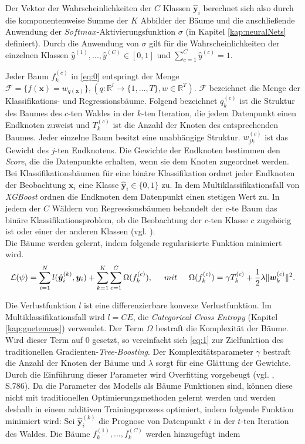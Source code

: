 \documentclass[a4paper,11pt]{article}
\begin{document}
Der Vektor der Wahrscheinlichkeiten der $C$ Klassen $\hat{\bm{y}}_i$ berechnet sich also durch die komponentenweise Summe der $K$ Abbilder der Bäume und die anschließende Anwendung der $Softmax$-Aktivierungsfunktion $\sigma$ (in Kapitel \ref{kap:neuralNets} definiert). Durch die Anwendung von $\sigma$ gilt für die Wahrscheinlichkeiten der einzelnen Klassen $\hat{y}^{(1)}, ..., \hat{y}^{(C)} \in [0,1]$ und $\sum_{c=1}^C \hat{y}^{(c)} = 1$.

Jeder Baum $f_k^{(c)}$ in \ref{eq:0} entspringt der Menge $ \mathcal{F} = \{f(\bm{x}) = w_{q(\bm{x})} \}, (q: \mathbb{R}^l \xrightarrow{} \{1,...,T\}, w \in \mathbb{R}^T)$. $\mathcal{F}$ bezeichnet die Menge der Klassifikations- und Regressionsbäume. Folgend bezeichnet $q_k^{(c)}$ ist die Struktur des Baumes des $c$-ten Waldes in der $k$-ten Iteration, die jedem Datenpunkt einen Endknoten zuweist und $T_k^{(c)}$ ist die Anzahl der Knoten des entsprechenden Baumes. Jeder einzelne Baum besitzt eine unabhängige Struktur. $w_{jk}^{(c)}$ ist das Gewicht des $j$-ten Endknotens. Die Gewichte der Endknoten bestimmen den \textit{Score}, die die Datenpunkte erhalten, wenn sie dem Knoten zugeordnet werden. Bei Klassifikationsbäumen für eine binäre Klassifikation ordnet jeder Endknoten der Beobachtung $\bm{x}_i$ eine Klasse $\hat{\bm{y}}_i \in \{0,1\}$ zu. In dem Multiklassifikationsfall von \textit{XGBoost} ordnen die Endknoten dem Datenpunkt einen stetigen Wert zu. In jedem der $C$ Wäldern von Regressionsbäumen behandelt der $c$-te Baum das binäre Klassifikationsproblem, ob die Beobachtung der $c$-ten Klasse $c$ zugehörig ist oder einer der anderen Klassen (vgl. \cite{XGBoostR}).\\
Die Bäume werden gelernt, indem folgende regularisierte Funktion minimiert wird.
\begin{equation}\label{eq:1}
   \mathcal{L}(\psi) = \sum_{i=1}^N l(\hat{\bm{y}}_i^{(k)}, \bm{y}_i) + \sum_{k=1}^K \sum_{c=1}^C \Omega(f_k^{(c)}), \hspace{0.5cm} mit \hspace{0.5cm}
\Omega(f_k^{(c)}) = \gamma T_k^{(c)} + \frac{1}{2} \lambda \|\bm{w}_k^{(c)}\|^2 . 
\end{equation}


Die Verlustfunktion $l$ ist eine differenzierbare konvexe Verlustfunktion. Im Multiklassifikationsfall wird $l = CE$, die \textit{Categorical Cross Entropy} (Kapitel \ref{kap:guetemass}) verwendet. Der Term $\Omega$ bestraft die Komplexität der Bäume. Wird dieser Term auf $0$ gesetzt, so vereinfacht sich \ref{eq:1} zur Zielfunktion des traditionellen Gradienten-\textit{Tree-Boosting}. Der Komplexitätsparameter $\gamma$ bestraft die Anzahl der Knoten der Bäume und $\lambda$ sorgt für eine Glättung der Gewichte. Durch die Einführung dieser Parameter wird Overfitting vorgebeugt (vgl. \cite{XGBoost}, S.786).
Da die Parameter des Modells als Bäume Funktionen sind, können diese nicht mit traditionellen Optimierungsmethoden gelernt werden und werden deshalb in einem additiven Trainingsprozess optimiert, indem folgende Funktion minimiert wird:
Sei $\hat{\bm{y}}_i^{(k)}$ die Prognose von Datenpunkt $i$ in der $t$-ten Iteration des Waldes. Die Bäume $f_k^{(1)}, ..., f_k^{(C)}$ werden hinzugefügt indem 
\end{document}
